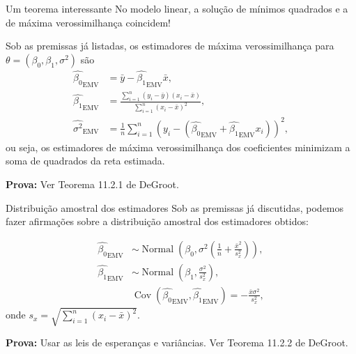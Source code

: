 \begin{frame}{Um teorema interessante}
No modelo linear, a solução de mínimos quadrados e a de máxima verossimilhança coincidem!
\begin{theo}
 Sob as premissas já listadas, os estimadores de máxima verossimilhança para $\theta = (\beta_0, \beta_1, \sigma^2)$ são
  \begin{align*}
  \hat{\beta_0}_{\text{EMV}} &= \bar{y} - \hat{\beta_1}_{\text{EMV}}\bar{x},\\
  \hat{\beta_1}_{\text{EMV}} &= \frac{\sum_{i=1}^n (y_i-\bar{y})(x_i-\bar{x})}{\sum_{i=1}^n \left(x_i - \bar{x}\right)^2},\\
  \hat{\sigma^2}_{\text{EMV}} & = \frac{1}{n} \sum_{i=1}^n \left(y_i - (  \hat{\beta_0}_{\text{EMV}} + \hat{\beta_1}_{\text{EMV}} x_i)\right)^2,  
 \end{align*}
 ou seja, os estimadores de máxima verossimilhança dos coeficientes minimizam a soma de quadrados da reta estimada.
\end{theo}
\textbf{Prova:} Ver Teorema 11.2.1 de DeGroot.
\end{frame}

\begin{frame}{Distribuição amostral dos estimadores}
Sob as premissas já discutidas, podemos fazer afirmações sobre a distribuição amostral dos estimadores obtidos:
\begin{theo}
   \begin{align*}
  \hat{\beta_0}_{\text{EMV}} &\sim \operatorname{Normal}\left(\beta_0, \sigma^2 \left( \frac{1}{n} + \frac{\bar{x}^2}{s_x^2} \right) \right),\\
  \hat{\beta_1}_{\text{EMV}}  &\sim \operatorname{Normal}\left(\beta_1, \frac{\sigma^2}{s_x^2}\right),\\
  &\operatorname{Cov}\left(\hat{\beta_0}_{\text{EMV}}, \hat{\beta_1}_{\text{EMV}} \right)  = -\frac{\bar{x}\sigma^2}{s_x^2},
 \end{align*}
 onde $s_x = \sqrt{\sum_{i=1}^n (x_i-\bar{x})^2}$.
\end{theo}
\textbf{Prova:} Usar as leis de esperanças e variâncias.
Ver Teorema 11.2.2 de DeGroot.
\end{frame}

